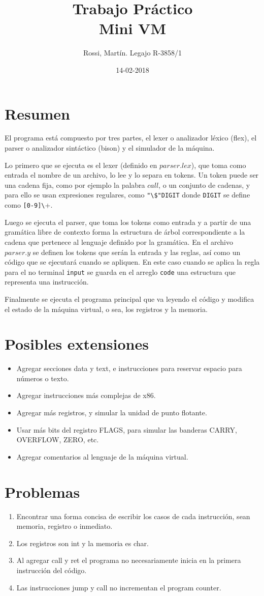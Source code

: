 \documentclass[12pt]{article}
\title{{\textbf{\Large{Trabajo Práctico}\\Mini VM}}}
\author{Rossi, Martín. Legajo R-3858/1}
\date{14-02-2018}
\begin{document}
\maketitle
\section*{Resumen}
\indent El programa está compuesto por tres partes, el lexer o analizador léxico (flex), el parser o analizador sintáctico (bison) y el simulador de la máquina.\par Lo primero que se ejecuta es el lexer (definido en $parser.lex$), que toma como entrada el nombre de un archivo, lo lee y lo separa en tokens. Un token puede ser una cadena fija, como por ejemplo la palabra $call$, o un conjunto de cadenas, y para ello se usan expresiones regulares, como \verb+"\$"DIGIT+ donde \verb+DIGIT+ se define como \verb+[0-9]\++.\par Luego se ejecuta el parser, que toma los tokens como entrada y a partir de una gramática libre de contexto forma la estructura de árbol correspondiente a la cadena que pertenece al lenguaje definido por la gramática. En el archivo $parser.y$ se definen los tokens que serán la entrada y las reglas, así como un código que se ejecutará cuando se apliquen. En este caso cuando se aplica la regla para el no terminal \verb+input+ se guarda en el arreglo \verb+code+ una estructura que representa una instrucción.\par Finalmente se ejecuta el programa principal que va leyendo el código y modifica el estado de la máquina virtual, o sea, los registros y la memoria.
\section*{Posibles extensiones}
\begin{itemize}
\item Agregar secciones data y text, e instrucciones para reservar espacio para números o texto.
\item Agregar instrucciones más complejas de x86.
\item Agregar más registros, y simular la unidad de punto flotante.
\item Usar más bits del registro FLAGS, para simular las banderas CARRY, OVERFLOW, ZERO, etc.
\item Agregar comentarios al lenguaje de la máquina virtual.
\end{itemize}
\section*{Problemas}
\begin{enumerate}
\item Encontrar una forma concisa de escribir los casos de cada instrucción, sean memoria, registro o inmediato.
\item Los registros son int y la memoria es char.
\item Al agregar call y ret el programa no necesariamente inicia en la primera instrucción del código.
\item Las instrucciones jump y call no incrementan el program counter.
\end{enumerate}
\end{document}
